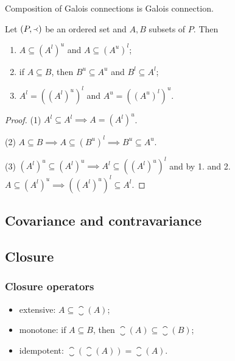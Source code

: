 \begin{lemma}
Composition of Galois connections is Galois connection.
\end{lemma}

\begin{corollary}
Let $(P,\Yleft)$ be an ordered set and $A,B$ subsets of $P$. Then
\begin{enumerate}
\item $A\subseteq (A^l)^u$ and $A\subseteq (A^u)^l$;
\item if $A\subseteq B$, then $B^u\subseteq A^u$ and $B^l \subseteq A^l$;
\item $A^l = ((A^l)^u)^l$ and $A^u = ((A^u)^l)^u$.
\end{enumerate}
\end{corollary}
\begin{proof}
(1) $A^l \subseteq A^l \implies A = (A^l)^u$.

(2) $A\subseteq B \implies A \subseteq (B^u)^l \implies B^u\subseteq A^u$.

(3) $(A^l)^u \subseteq (A^l)^u \implies A^l \subseteq ((A^l)^u)^l$ and by 1. and 2. $A\subseteq (A^l)^u \implies ((A^l)^u)^l \subseteq A^l$.
\end{proof}

\subsection{Covariance and contravariance}


\subsection{Closure}

\subsubsection{Closure operators}

\begin{definition}
\begin{itemize}
\item extensive: $A \subseteq \closure(A)$;
\item monotone: if $A \subseteq B$, then $\closure(A) \subseteq \closure(B)$;
\item idempotent: $\closure(\closure(A)) = \closure(A)$.
\end{itemize}
\end{definition}

